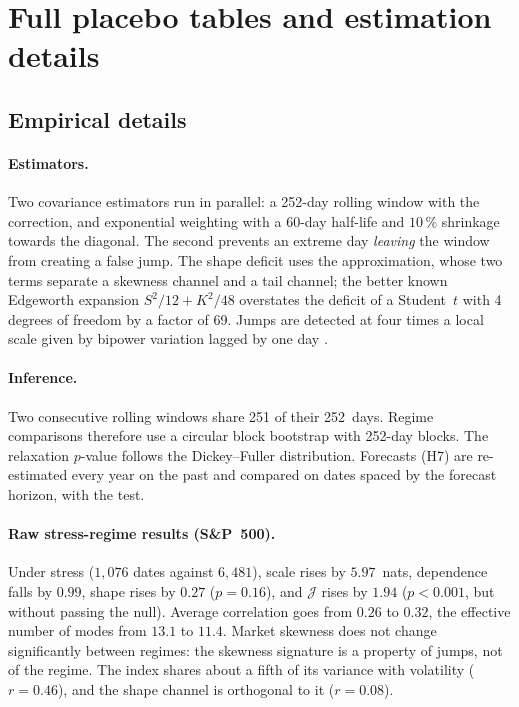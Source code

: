 \documentclass[11pt]{article}
\theoremstyle{definition}
\newcommand{\JJ}{\mathcal{J}}
\begin{document}
\section{Full placebo tables and estimation details}
\label{oa:placebo}
\subsection{Empirical details}


\paragraph{Estimators.} Two covariance estimators run in parallel: a 252-day
rolling window with the \citet{ledoit2004} correction, and exponential
weighting with a 60-day half-life and $10\,\%$ shrinkage towards the diagonal.
The second prevents an extreme day \emph{leaving} the window from creating a
false jump. The shape deficit uses the \citet{hyvarinen1998} approximation,
whose two terms separate a skewness channel and a tail channel; the better
known Edgeworth expansion $S^2/12+K^2/48$ overstates the deficit of a
Student~$t$ with 4 degrees of freedom by a factor of 69. Jumps are detected at
four times a local scale given by bipower variation lagged by one day
\citep{bns2004}.

\paragraph{Inference.} Two consecutive rolling windows share 251 of their
252~days. Regime comparisons therefore use a circular block bootstrap with
252-day blocks. The relaxation $p$-value follows the Dickey--Fuller
distribution. Forecasts (H7) are re-estimated every year on the past and
compared on dates spaced by the forecast horizon, with the \citet{dm1995}
test.

\paragraph{Raw stress-regime results (S\&P~500).} Under stress ($1,076$ dates
against $6,481$), scale rises by $5.97$~nats, dependence falls by $0.99$,
shape rises by $0.27$ ($p=0.16$), and $\JJ$ rises by $1.94$ ($p<0.001$, but
without passing the null). Average correlation goes from $0.26$ to $0.32$, the
effective number of modes from $13.1$ to $11.4$. Market skewness does not
change significantly between regimes: the skewness signature is a property of
jumps, not of the regime. The index shares about a fifth of its variance with
volatility ($r=0.46$), and the shape channel is orthogonal to it ($r=0.08$).
\end{document}
